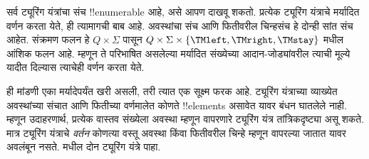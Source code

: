 \documentclass[../../../include/open-logic-section]{subfiles}
\begin{document}

\begin{explain}
सर्व ट्यूरिंग यंत्रांचा संच !!{enumerable}
आहे, असे आपण दाखवू शकतो. प्रत्येक ट्यूरिंग यंत्राचे
मर्यादित वर्णन करता येते, ही त्यामागची बाब आहे. अवस्थांचा
संच आणि फितीवरील चिन्हसंच हे दोन्ही सांत संच आहेत.
संक्रमण फलन हे $Q \times \Sigma$ पासून
$Q \times \Sigma \times \{\TMleft, \TMright, \TMstay\}$
मधील आंशिक फलन आहे. म्हणून ते परिभाषित असलेल्या
मर्यादित संख्येच्या आदान-जोड्यांवरील त्याची मूल्ये
यादीत दिल्यास त्याचेही वर्णन करता येते.

ही मांडणी एका मर्यादेपर्यंत खरी असली, तरी त्यात
एक सूक्ष्म फरक आहे. ट्यूरिंग यंत्राच्या व्याख्येत
अवस्थांच्या संचात आणि फितीच्या वर्णमालेत कोणते
!!{element}s असावेत यावर बंधन घातलेले नाही.
म्हणून उदाहरणार्थ, प्रत्येक वास्तव संख्येला अवस्था
म्हणून वापरणारे ट्यूरिंग यंत्र तांत्रिकदृष्ट्या
असू शकते. मात्र ट्यूरिंग यंत्राचे \emph{वर्तन}
कोणत्या वस्तू अवस्था किंवा फितीवरील चिन्हे म्हणून
वापरल्या जातात यावर अवलंबून नसते.
 मधील दोन ट्यूरिंग यंत्रे पाहा.
\begin{figure}
\begin{center}
\\
\end{center}
\end{figure}
\end{explain}
\end{document}
